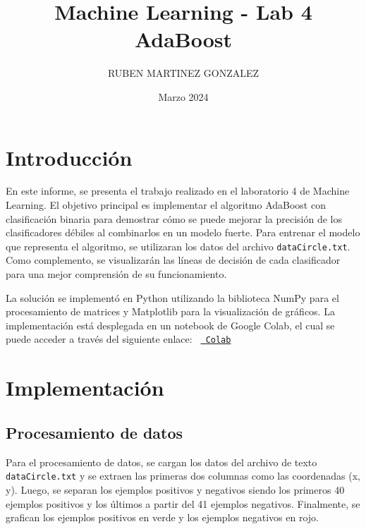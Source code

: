 \documentclass{article}
\title{Machine Learning - Lab 4 AdaBoost}
\author{RUBEN MARTINEZ GONZALEZ}
\date{Marzo 2024}
\begin{document}
    \maketitle


    \section{Introducción}\label{sec:introduccion}
    En este informe, se presenta el trabajo realizado en el laboratorio 4 de Machine Learning.
    El objetivo principal es implementar el algoritmo AdaBoost con clasificación binaria para demostrar
    cómo se puede mejorar la precisión de los clasificadores débiles al combinarlos en un modelo fuerte.
    Para entrenar el modelo que representa el algoritmo, se utilizaran los datos del archivo \texttt{dataCircle.txt}.
    Como complemento, se visualizarán las líneas de decisión de cada clasificador para una mejor comprensión de su funcionamiento.

    \noindent
    La solución se implementó en Python utilizando la biblioteca NumPy para el procesamiento de matrices y
    Matplotlib para la visualización de gráficos.
    \newline
    La implementación está desplegada en un notebook de Google Colab, el cual se puede acceder a través del siguiente enlace:
    \texttt{%
        \href{https://colab.research.google.com/drive/15pMQbVvI-XgngN3rFxADCHmMX9fd3Vl1?usp=sharing}{%
            Colab}%
    }


    \section{Implementación}\label{sec:implementacion}

    \subsection{Procesamiento de datos}\label{subsec:procesamiento_de_datos}

    Para el procesamiento de datos, se cargan los datos del archivo de texto \texttt{dataCircle.txt}
    y se extraen las primeras dos columnas como las coordenadas (x, y).
    Luego, se separan los ejemplos positivos y negativos siendo los primeros 40 ejemplos positivos y los últimos a partir del 41 ejemplos negativos.
    Finalmente, se grafican los ejemplos positivos en verde y los ejemplos negativos en rojo.
\end{document}
